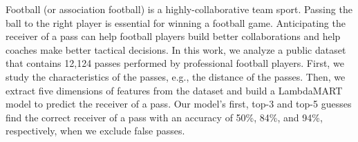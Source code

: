 Football (or association football) is a highly-collaborative team sport. 
Passing the ball to the right player is essential for winning a football game.
Anticipating the receiver of a pass can help football players build better collaborations and help coaches make better tactical decisions.
In this work, we analyze a public dataset that contains 12,124 passes performed by professional football players.
First, we study the characteristics of the passes, e.g., the distance of the passes.
Then, we extract five dimensions of features from the dataset and build a LambdaMART model to predict the receiver of a pass. 
Our model's first, top-3 and top-5 guesses find the correct receiver of a pass with an accuracy of 50\%, 84\%, and 94\%, respectively, when we exclude false passes.